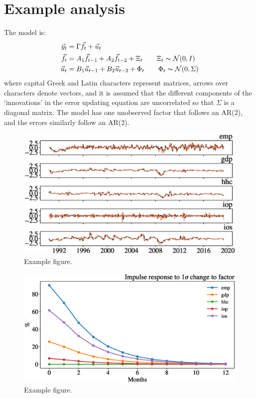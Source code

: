 \section{Example analysis}
The model is:
$$
\begin{aligned} 
	\vec{y}_t & = \Gamma \vec{f}_t + \vec{u}_t \\ 
        \vec{f}_t & = A_1 \vec{f}_{t-1} + A_2\vec{f}_{t-2} + \Xi_t \quad \quad \Xi_t \thicksim \mathcal{N}(0,I)\\ 
	 \vec{u}_t  & = B_1 \vec{u}_{t-1} + B_2\vec{u}_{t-2} + \Phi_t \quad \quad \Phi_t \thicksim \mathcal{N}(0,\Sigma)
\end{aligned} 
$$
where capital Greek and Latin characters represent matrices, arrows over characters denote vectors, and it is assumed that the different components of the `innovations' in the error updating equation are uncorrelated so that $ \Sigma $ is a diagonal matrix. The model has one unobserved factor that follows an AR(2), and the errors similarly follow an AR(2).


\begin{figure}[h]
	\includegraphics[width=\textwidth]{fcasts.eps} 
	\caption{Example figure. \label{fig:example}}
\end{figure}

\begin{figure}[h]
	\includegraphics[width=\textwidth]{df_irfs.eps} 
	\caption{Example figure. \label{fig:example}}
\end{figure}

